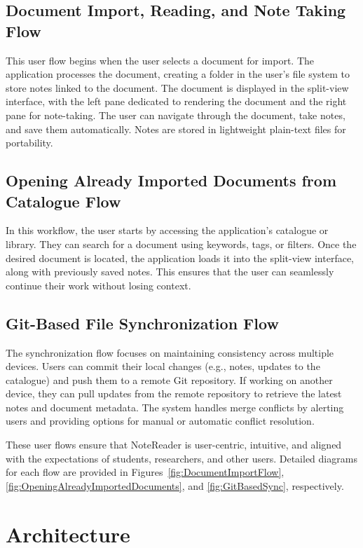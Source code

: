 \subsection{Document Import, Reading, and Note Taking Flow}
This user flow begins when the user selects a document for import. The application processes the document, creating a folder in the user's file system to store notes linked to the document. The document is displayed in the split-view interface, with the left pane dedicated to rendering the document and the right pane for note-taking. The user can navigate through the document, take notes, and save them automatically. Notes are stored in lightweight plain-text files for portability.

\subsection{Opening Already Imported Documents from Catalogue Flow}
In this workflow, the user starts by accessing the application's catalogue or library. They can search for a document using keywords, tags, or filters. Once the desired document is located, the application loads it into the split-view interface, along with previously saved notes. This ensures that the user can seamlessly continue their work without losing context.

\subsection{Git-Based File Synchronization Flow}
The synchronization flow focuses on maintaining consistency across multiple devices. Users can commit their local changes (e.g., notes, updates to the catalogue) and push them to a remote Git repository. If working on another device, they can pull updates from the remote repository to retrieve the latest notes and document metadata. The system handles merge conflicts by alerting users and providing options for manual or automatic conflict resolution.

These user flows ensure that NoteReader is user-centric, intuitive, and aligned with the expectations of students, researchers, and other users. Detailed diagrams for each flow are provided in Figures~\ref{fig:DocumentImportFlow}, \ref{fig:OpeningAlreadyImportedDocuments}, and \ref{fig:GitBasedSync}, respectively.


\section{Architecture} \label{sec:Arch}

